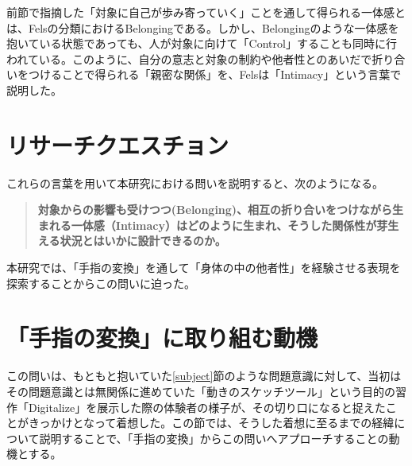 

前節で指摘した「対象に自己が歩み寄っていく」ことを通して得られる一体感とは、Felsの分類におけるBelongingである。しかし、Belongingのような一体感を抱いている状態であっても、人が対象に向けて「Control」することも同時に行われている。このように、自分の意志と対象の制約や他者性とのあいだで折り合いをつけることで得られる「親密な関係」を、Felsは「Intimacy」という言葉で説明した。

\section{リサーチクエスチョン}

これらの言葉を用いて本研究における問いを説明すると、次のようになる。

\begin{quote}
\textbf{対象からの影響も受けつつ(Belonging)、相互の折り合いをつけながら生まれる一体感（Intimacy）はどのように生まれ、そうした関係性が芽生える状況とはいかに設計できるのか。}
\end{quote}

本研究では、「手指の変換」を通して「身体の中の他者性」を経験させる表現を探索することからこの問いに迫った。


\section{「手指の変換」に取り組む動機}
\label{prototyping_concept_making}
この問いは、もともと抱いていた\ref{subject}節のような問題意識に対して、当初はその問題意識とは無関係に進めていた「動きのスケッチツール」という目的の習作「Digitalize」を展示した際の体験者の様子が、その切り口になると捉えたことがきっかけとなって着想した。この節では、そうした着想に至るまでの経緯について説明することで、「手指の変換」からこの問いへアプローチすることの動機とする。

